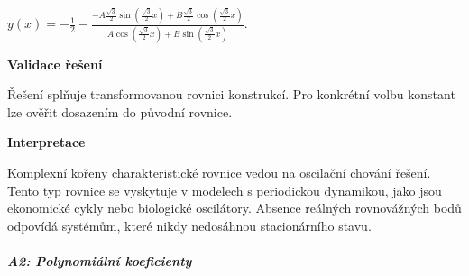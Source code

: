 \begin{example}
    $y(x) = -\frac{1}{2} - \frac{-A\frac{\sqrt{3}}{2}\sin\left(\frac{\sqrt{3}}{2}x\right) + B\frac{\sqrt{3}}{2}\cos\left(\frac{\sqrt{3}}{2}x\right)}{A\cos\left(\frac{\sqrt{3}}{2}x\right) + B\sin\left(\frac{\sqrt{3}}{2}x\right)}$.
    
    \vspace{1.5\baselineskip}
    
    \noindent\textbf{Validace řešení}
    
    Řešení splňuje transformovanou rovnici konstrukcí. Pro konkrétní volbu konstant lze ověřit dosazením do původní rovnice.
    
    \vspace{1.5\baselineskip}
    
    \noindent\textbf{Interpretace}
    
    Komplexní kořeny charakteristické rovnice vedou na oscilační chování řešení. 
    Tento typ rovnice se vyskytuje v modelech s periodickou dynamikou, jako jsou 
    ekonomické cykly nebo biologické oscilátory. Absence reálných rovnovážných bodů 
    odpovídá systémům, které nikdy nedosáhnou stacionárního stavu.
    
    \end{example}
    
    \vspace{2\baselineskip}
    
    \subparagraph*{A2: Polynomiální koeficienty}
    \label{subpar:l2-riccati-a2-polynomialni-koeficienty}
    
